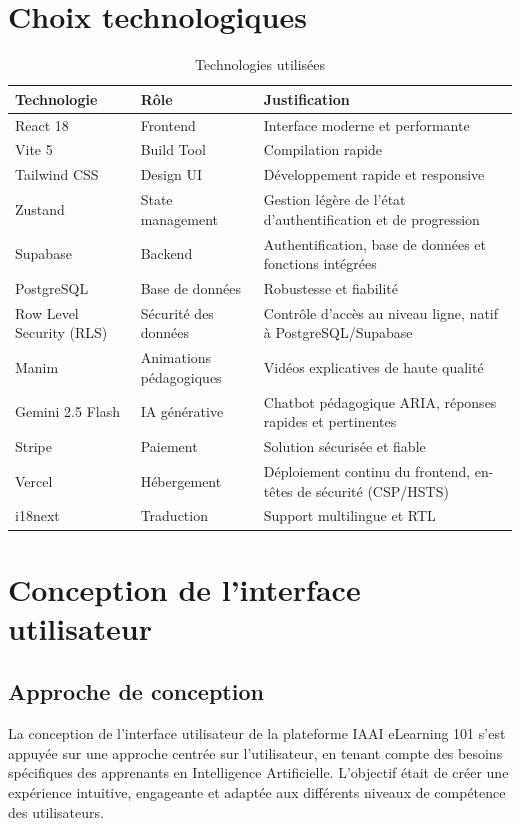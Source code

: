 \documentclass[12pt, a4paper]{report}
\begin{document}
\section{Choix technologiques}
\begin{table}[H]
\centering
\caption{Technologies utilisées}
\begin{tabularx}{\textwidth}{|>{\centering\arraybackslash}p{2.7cm}|X|p{3.6cm}|}
\hline
\textbf{Technologie} & \textbf{Rôle} & \textbf{Justification} \\
\hline
React 18 & Frontend & Interface moderne et performante \\
\hline
Vite 5 & Build Tool & Compilation rapide \\
\hline
Tailwind CSS & Design UI & Développement rapide et responsive \\
\hline
Zustand & State management & Gestion légère de l'état d'authentification et de progression \\
\hline
Supabase & Backend & Authentification, base de données et fonctions intégrées \\
\hline
PostgreSQL & Base de données & Robustesse et fiabilité \\
\hline
Row Level Security (RLS) & Sécurité des données & Contrôle d'accès au niveau ligne, natif à PostgreSQL/Supabase \\
\hline
Manim & Animations pédagogiques & Vidéos explicatives de haute qualité \\
\hline
Gemini 2.5 Flash & IA générative & Chatbot pédagogique ARIA, réponses rapides et pertinentes \\
\hline
Stripe & Paiement & Solution sécurisée et fiable \\
\hline
Vercel & Hébergement & Déploiement continu du frontend, en-têtes de sécurité (CSP/HSTS) \\
\hline
i18next & Traduction & Support multilingue et RTL \\
\hline
\end{tabularx}
\end{table}
\section{Conception de l'interface utilisateur}
\subsection{Approche de conception}

La conception de l'interface utilisateur de la plateforme IAAI eLearning 101 s'est appuyée sur une approche centrée sur l'utilisateur, en tenant compte des besoins spécifiques des apprenants en Intelligence Artificielle. L'objectif était de créer une expérience intuitive, engageante et adaptée aux différents niveaux de compétence des utilisateurs.
\end{document}

